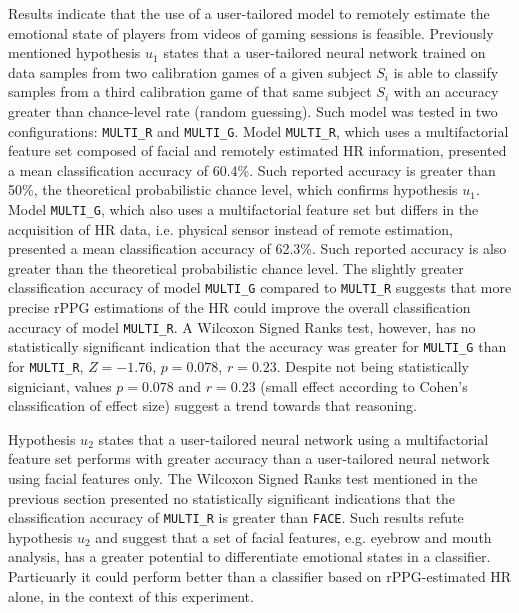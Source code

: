 

Results indicate that the use of a user-tailored model to remotely estimate the emotional state of players from videos of gaming sessions is feasible. Previously mentioned hypothesis $u_1$ states that a user-tailored neural network trained on data samples from two calibration games of a given subject $S_i$ is able to classify samples from a third calibration game of that same subject $S_i$ with an accuracy greater than chance-level rate (random guessing). Such model was tested in two configurations: \texttt{MULTI\_R} and \texttt{MULTI\_G}. Model \texttt{MULTI\_R}, which uses a multifactorial feature set composed of facial and remotely estimated HR information, presented a mean classification accuracy of 60.4\%. Such reported accuracy is greater than 50\%, the theoretical probabilistic chance level, which confirms hypothesis $u_1$. Model \texttt{MULTI\_G}, which also uses a multifactorial feature set but differs in the acquisition of HR data, i.e. physical sensor instead of remote estimation, presented a mean classification accuracy of 62.3\%. Such reported accuracy is also greater than the theoretical probabilistic chance level. The slightly greater classification accuracy of model \texttt{MULTI\_G} compared to \texttt{MULTI\_R} suggests that more precise rPPG estimations of the HR could improve the overall classification accuracy of model \texttt{MULTI\_R}. A Wilcoxon Signed Ranks test, however, has no statistically significant indication that the accuracy was greater for \texttt{MULTI\_G} than for \texttt{MULTI\_R}, $Z=-1.76$, $p=0.078$, $r=0.23$. Despite not being statistically signiciant, values $p=0.078$ and $r=0.23$ (small effect according to Cohen's classification of effect size) suggest a trend towards that reasoning.

Hypothesis $u_2$ states that a user-tailored neural network using a multifactorial feature set performs with greater accuracy than a user-tailored neural network using facial features only. The Wilcoxon Signed Ranks test mentioned in the previous section presented no statistically significant indications that the classification accuracy of \texttt{MULTI\_R} is greater than \texttt{FACE}. Such results refute hypothesis $u_2$ and suggest that a set of facial features, e.g. eyebrow and mouth analysis, has a greater potential to differentiate emotional states in a classifier. Particuarly it could perform better than a classifier based on rPPG-estimated HR alone, in the context of this experiment.

